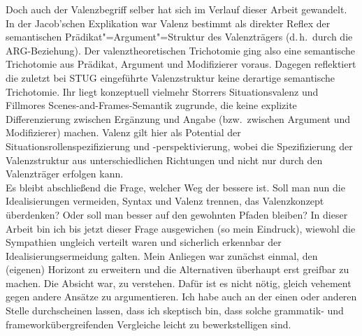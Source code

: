 Doch auch der Valenzbegriff selber hat sich im Verlauf dieser Arbeit gewandelt. In der Jacob'schen Explikation war Valenz bestimmt als direkter Reflex der semantischen Prädikat"=Argument"=Struktur des Valenzträgers (d.\,h.\ durch die ARG-Beziehung). Der valenztheoretischen Trichotomie ging also eine semantische Trichotomie aus Prädikat, Argument und Modifizierer voraus. Dagegen reflektiert die zuletzt bei STUG eingeführte Valenzstruktur keine derartige semantische Trichotomie. Ihr liegt konzeptuell vielmehr Storrers Situationsvalenz und Fillmores Scenes-and-Frames-Semantik zugrunde, die keine explizite Differenzierung zwischen Ergänzung und Angabe (bzw.\ zwischen Argument und Modifizierer) machen. Valenz gilt hier als Potential der Situationsrollenspezifizierung und \mbox{-perspektivierung}, wobei die Spezifizierung der Valenzstruktur aus unterschiedlichen Richtungen und nicht nur durch den Valenzträger erfolgen kann. \\ 

Es bleibt abschließend die Frage, welcher Weg der bessere ist. Soll man nun die Idealisierungen vermeiden, Syntax und Valenz trennen, das Valenzkonzept überdenken? Oder soll man besser auf den gewohnten Pfaden bleiben? In dieser Arbeit bin ich bis jetzt dieser Frage ausgewichen (so mein Eindruck), wiewohl die Sympathien ungleich verteilt waren und sicherlich erkennbar der Idealisierungsermeidung galten. Mein Anliegen war zunächst einmal, den (eigenen) Horizont zu erweitern und die Alternativen überhaupt erst greifbar zu machen. Die Absicht war, zu verstehen. Dafür ist es nicht nötig, gleich vehement gegen andere Ansätze zu argumentieren. Ich habe auch an der einen oder anderen Stelle durchscheinen lassen, dass ich skeptisch bin, dass solche grammatik- und frameworkübergreifenden Vergleiche leicht zu bewerkstelligen sind. 

